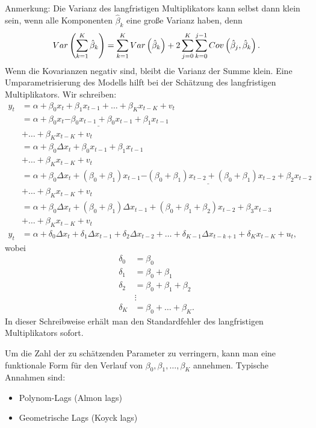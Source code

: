 \documentclass{article}
\begin{document}
Anmerkung: Die Varianz des langfristigen Multiplikators kann selbst dann
klein sein, wenn alle Komponenten $\hat{\beta}_{k}$ eine große Varianz haben,
denn
\[
Var\left( \sum_{k=1}^{K}\hat\beta_{k}\right) =\sum_{k=1}^{K}Var\left( \hat{%
	\beta}_{k}\right) +2\sum_{j=0}^{K}\sum_{k=0}^{j-1}Cov\left( \hat\beta_{j},%
\hat\beta_{k}\right) . 
\]
Wenn die Kovarianzen negativ sind, bleibt die Varianz der Summe klein.
Eine Umparametrisierung des Modells hilft bei der Schätzung des
langfristigen Multiplikators. Wir schreiben:
\begin{align*}
y_{t} &=\alpha +\beta _{0}x_{t}+\beta _{1}x_{t-1}+\ldots +\beta_{K}x_{t-K}+v_{t} \\
&=\alpha +\beta _{0}x_{t}\underline{-\beta _{0}x_{t-1}+\beta _{0}x_{t-1}}+\beta _{1}x_{t-1} \\
&+\ldots +\beta _{K}x_{t-K}+v_{t} \\
&=\alpha +\beta _{0}\Delta x_{t}+\beta _{0}x_{t-1}+\beta _{1}x_{t-1} \\
&+\ldots +\beta _{K}x_{t-K}+v_{t} \\
&=\alpha +\beta _{0}\Delta x_{t}+\left( \beta _{0}+\beta _{1}\right) x_{t-1}%
\underline{-\left( \beta _{0}+\beta _{1}\right) x_{t-2}+\left( \beta
	_{0}+\beta _{1}\right) x_{t-2}}+\beta _{2}x_{t-2} \\
&+\ldots +\beta _{K}x_{t-K}+v_{t} \\
&=\alpha +\beta _{0}\Delta x_{t}+\left( \beta _{0}+\beta _{1}\right) \Delta
x_{t-1}+\left( \beta _{0}+\beta _{1}+\beta _{2}\right) x_{t-2}+\beta_{3}x_{t-3} \\
&+\ldots +\beta _{K}x_{t-K}+v_{t} \\
y_{t} &=\alpha +\delta _{0}\Delta x_{t}+\delta _{1}\Delta x_{t-1}+\delta
_{2}\Delta x_{t-2}+\ldots +\delta _{K-1}\Delta x_{t-k+1}+\delta
_{K}x_{t-K}+u_{t},
\end{align*}
wobei
\begin{align*}
\delta _{0} &=\beta _{0} \\
\delta _{1} &=\beta _{0}+\beta _{1} \\
\delta _{2} &=\beta _{0}+\beta _{1}+\beta _{2} \\
&\vdots \\
\delta _{K} &=\beta _{0}+\ldots +\beta _{K}.
\end{align*}
In dieser Schreibweise erhält man den Standardfehler des langfristigen 
Multiplikators sofort.

Um die Zahl der zu schätzenden Parameter zu verringern, kann
man eine funktionale Form für den Verlauf von 
$\beta _{0},\beta _{1},\ldots ,\beta _{K}$ annehmen.
Typische Annahmen sind:
\begin{itemize}
	\item Polynom-Lags (Almon lags)
	\item Geometrische Lags (Koyck lags)
\end{itemize}
\end{document}
